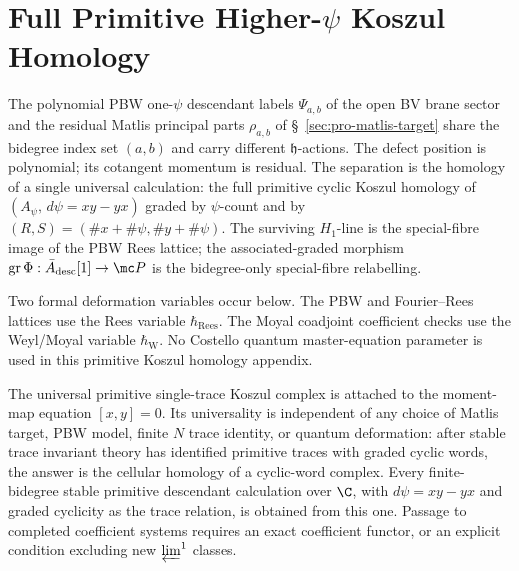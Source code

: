 \section{\texorpdfstring{Full Primitive Higher-\(\psi\) Koszul Homology}{Full Primitive Higher-psi Koszul Homology}}
\label{sec:app-full-psi-homology}

The polynomial PBW one-\(\psi\) descendant labels \(\Psi_{a,b}\) of the
open BV brane sector and the residual Matlis principal parts
\(\rho_{a,b}\) of \S~\ref{sec:pro-matlis-target} share
the bidegree index set \((a,b)\) and carry different
\(\mathfrak h\)-actions.  The defect position is polynomial; its
cotangent momentum is residual.  The separation is the homology of a
single universal calculation: the full primitive cyclic Koszul
homology of \((A_\psi,\,d\psi=xy-yx)\) graded by \(\psi\)-count and by
\((R,S)=(\#x+\#\psi,\#y+\#\psi)\).  The surviving \(H_1\)-line is the
special-fibre image of the PBW Rees lattice; the associated-graded
morphism
\(\operatorname{gr}\Phi:\bar A_{\mathrm{desc}}[1]\to\mc P\) is the
bidegree-only special-fibre relabelling.

Two formal deformation variables occur below.  The PBW and
Fourier--Rees lattices use the Rees variable \(\hbar_{\mathrm{Rees}}\).
The Moyal coadjoint coefficient checks use the Weyl/Moyal variable
\(\hbar_{\mathrm{W}}\).  No Costello quantum master-equation parameter
is used in this primitive Koszul homology appendix.

The universal primitive single-trace Koszul complex is attached to the
moment-map equation \([x,y]=0\).  Its universality is independent of any
choice of Matlis target, PBW model, finite \(N\) trace identity, or quantum
deformation: after stable trace invariant theory has identified
primitive traces with graded cyclic words, the answer is the cellular homology
of a cyclic-word complex.  Every finite-bidegree stable primitive
descendant calculation over \(\C\), with \(d\psi=xy-yx\) and graded
cyclicity as the trace relation, is obtained from this one.  Passage to
completed coefficient systems requires an exact coefficient functor, or an
explicit condition excluding new \(\varprojlim^1\) classes.

